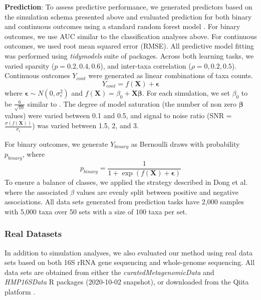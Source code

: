 \documentclass[10pt,letterpaper]{article}
\begin{document}
\noindent \textbf{Prediction}: To assess predictive performance, we generated predictors based on the simulation schema presented above and evaluated prediction for both binary and continuous outcomes using a standard random forest model \cite{breiman2001}. For binary outcomes, we use AUC similar to the classification analyses above. For continuous outcomes, we used root mean squared error (RMSE). All predictive model fitting was performed using \emph{tidymodels} \cite{kuhn2020} suite of packages. Across both learning tasks, we varied sparsity ($p = 0.2, 0.4, 0.6$), and inter-taxa correlation ($\rho = 0, 0.2, 0.5$). Continuous outcomes $Y_{cont}$ were generated as linear combinations of taxa counts.  
\begin{equation}
    Y_{cont} = f(\mathbf{X}) + \mathbf{\epsilon}
\end{equation}
where $\mathbf{\epsilon} \sim N(0, \sigma_{\epsilon}^2)$ and $f(\mathbf{X}) = \beta_0 + \mathbf{X}\mathbf{\beta}$. For each simulation, we set $\beta_0$ to be $\frac{6}{\sqrt{10}}$ similar to \cite{xiao2018}. The degree of model saturation (the number of non zero $\mathbf{\beta}$ values) were varied between 0.1 and 0.5, and signal to noise ratio (SNR = $\frac{\sigma(f(\mathbf{X}))}{\sigma_{\epsilon}}$) was varied between 1.5, 2, and 3. 

For binary outcomes, we generate $Y_{binary}$ as Bernoulli draws with probability $p_{binary}$, where 
\begin{equation}
    p_{binary} = \frac{1}{1 + \exp(f(\mathbf{X}) + \mathbf{\epsilon})}
\end{equation}
To ensure a balance of classes, we applied the strategy described in Dong et al. \cite{dong2020} where the associated $\beta$ values are evenly split between positive and negative associations. All data sets generated from prediction tasks have 2,000 samples with 5,000 taxa over 50 sets with a size of 100 taxa per set.  

\subsubsection*{Real Datasets}

In addition to simulation analyses, we also evaluated our method using real data sets based on both 16S rRNA gene sequencing and whole-genome sequencing. All data sets are obtained from either the \emph{curatedMetagenomicData} \cite{pasolli2017} and \emph{HMP16SData} \cite{schiffer2019} R packages (2020-10-02 snapshot), or downloaded from the Qiita platform \cite{gonzalez2018}.  
\end{document}
